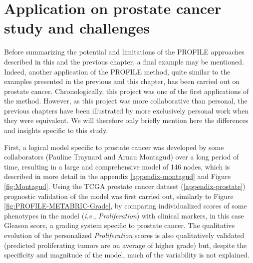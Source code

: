 \documentclass[a4paper,12pt,twoside,onecolumn,openright,final,oldfontcommands]{memoir}
\begin{document}
\section{Application on prostate cancer study and
challenges}\label{prostate-model}

Before summarizing the potential and limitations of the PROFILE
approaches described in this and the previous chapter, a final example
may be mentioned. Indeed, another application of the PROFILE method,
quite similar to the examples presented in the previous and this
chapter, has been carried out on prostate cancer. Chronologically, this
project was one of the first applications of the method. However, as
this project was more collaborative than personal, the previous chapters
have been illustrated by more exclusively personal work when they were
equivalent. We will therefore only briefly mention here the differences
and insights specific to this study.

First, a logical model specific to prostate cancer was developed by some
collaborators (Pauline Traynard and Arnau Montagud) over a long period
of time, resulting in a large and comprehensive model of 146 nodes,
which is described in more detail in the appendix
\ref{appendix-montagud} and Figure \ref{fig:Montagud}. Using the TCGA
prostate cancer dataset (\ref{appendix-prostate}) prognostic validation
of the model was first carried out, similarly to Figure
\ref{fig:PROFILE-METABRIC-Grade}, by comparing individualized scores of
some phenotypes in the model (\emph{i.e.}, \emph{Proliferation}) with
clinical markers, in this case Gleason score, a grading system specific
to prostate cancer. The qualitative evolution of the personalized
\emph{Proliferation} scores is also qualitatively validated (predicted
proliferating tumors are on average of higher grade) but, despite the
specificity and magnitude of the model, much of the variability is not
explained.
\end{document}
